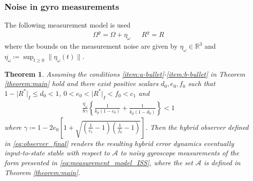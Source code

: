 \documentclass{article}
\newcommand{\R}[1]{\mathbb{R}^{#1}}
\newcommand{\Omegay}{\Omega^y}
\newtheorem{theorem}{Theorem}
\newcommand{\brackets}[1]{\left(#1\right)}
\newcommand{\normSOthree}[1]{{{\vert}#1 {\vert}_I}}
\newcommand{\Rstar}{{R^*}}
\newcommand{\noisegyro}{\eta_\omega}
\newcommand{\maxnoisegyro}{\overline{\eta_\omega}}
\begin{document}
\subsubsection{Noise in gyro measurements}
The following measurement model is used
\begin{align}\label{eq:measurement_model_ISS}
    \Omegay = \Omega + \noisegyro && R^y = R 
\end{align}
where the bounds on the measurement noise are given by $\noisegyro\in\R{3}$ and $\overline{\noisegyro}\coloneqq\sup_{t\geq 0} \|\noisegyro(t)\|$.
\begin{theorem}\label{theorem:PCF_ISS_gyro}
    Assuming the conditions \ref{item:a-bullet}-\ref{item:b-bullet} in Theorem \ref{theorem:main} hold and there exist positive scalars $d_0, e_0, f_0$ such that $1 - \normSOthree{\Rstar}\leq d_0 < 1$, $0 < e_0 < \normSOthree{\Rstar} < f_0 < c_1$ and
    \begin{align*}
        \frac{\maxnoisegyro}{8\gamma}\left\{\frac{1}{k_p(1-c_0)} + \frac{1}{\overline{k_p}(1-d_0)}\right\} < 1
    \end{align*}
    where $\gamma \coloneqq {1 - 2e_0\left[1 + \sqrt{\brackets{\frac{1}{c_1}-1}\brackets{\frac{1}{f_0}-1}}\right]}$. Then the hybrid observer defined in \eqref{eq:observer_final} renders the resulting hybrid error dynamics {eventually input-to-state stable} with respect to $\mathcal{A}$ to noisy gyroscope measurements of the form presented in \eqref{eq:measurement_model_ISS}, where the set $\mathcal{A}$ is defined in Theorem \ref{theorem:main}. 
\end{theorem}
\end{document}
